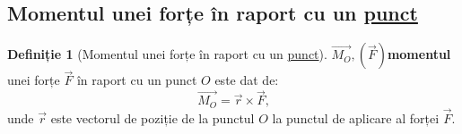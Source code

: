 \documentclass[a4paper]{article}
\theoremstyle{definition}
\newtheorem{definition}{Definiție}[section]
\theoremstyle{plain}%
\theoremstyle{remark}
\begin{document}
\subsection{Momentul unei forțe în raport cu un \underline{punct}}

\begin{definition}[Momentul unei forțe în raport cu un \underline{punct}]
	\(\overrightarrow{M_O}, (\vec F)\)\textbf{momentul} unei forțe \(\vec F\) în raport cu un punct \(O\) este dat de:
	\begin{equation*}
		\overrightarrow{M_O} = \vec r \times \vec F \text{,}
	\end{equation*}
	unde \(\vec r\) este vectorul de poziție de la punctul \(O\) la punctul de aplicare al forței \(\vec F\).
\end{definition}
\end{document}
